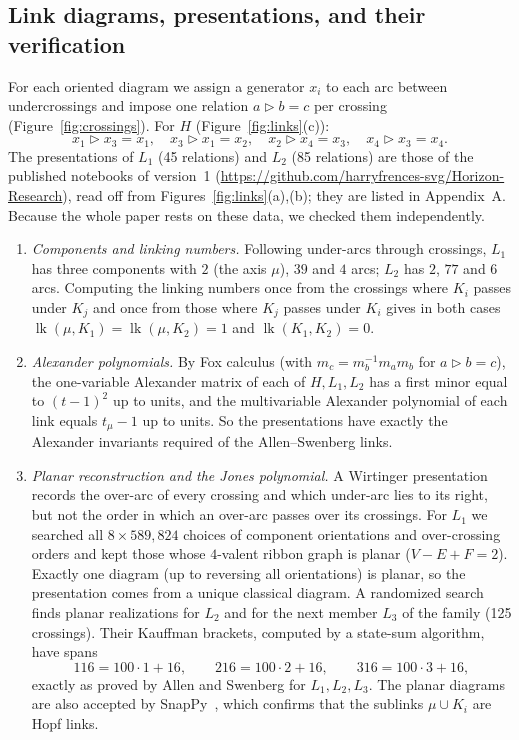 \documentclass[11pt]{article}
\theoremstyle{definition}
\newcommand{\lk}{\operatorname{lk}}
\newcommand{\tr}{\triangleright}
\begin{document}
\subsection{Link diagrams, presentations, and their verification}\label{ssec:data}

For each oriented diagram we assign a generator $x_i$ to each arc between undercrossings and impose one
relation $a\tr b=c$ per crossing (Figure~\ref{fig:crossings}). For $H$ (Figure~\ref{fig:links}(c)):
\[
x_1\tr x_3=x_1,\quad x_3\tr x_1=x_2,\quad x_2\tr x_4=x_3,\quad x_4\tr x_3=x_4 .
\]
The presentations of $L_1$ (45 relations) and $L_2$ (85 relations) are those of the published
notebooks of version~1 (\url{https://github.com/harryfrences-svg/Horizon-Research}), read off from
Figures~\ref{fig:links}(a),(b); they are listed in Appendix~A. Because the whole paper rests on these data, we checked them independently.

\begin{enumerate}
\item \emph{Components and linking numbers.} Following under-arcs through crossings, $L_1$ has three
components with $2$ (the axis $\mu$), $39$ and $4$ arcs; $L_2$ has $2$, $77$ and $6$ arcs. Computing the
linking numbers once from the crossings where $K_i$ passes under $K_j$ and once from those where $K_j$
passes under $K_i$ gives in both cases $\lk(\mu,K_1)=\lk(\mu,K_2)=1$ and $\lk(K_1,K_2)=0$.
\item \emph{Alexander polynomials.} By Fox calculus (with $m_c=m_b^{-1}m_am_b$ for $a\tr b=c$), the
one-variable Alexander matrix of each of $H,L_1,L_2$ has a first minor equal to $(t-1)^2$ up to units,
and the multivariable Alexander polynomial of each link equals $t_\mu-1$ up to units. So the
presentations have exactly the Alexander invariants required of the Allen--Swenberg links.
\item \emph{Planar reconstruction and the Jones polynomial.} A Wirtinger presentation records the
over-arc of every crossing and which under-arc lies to its right, but not the order in which an
over-arc passes over its crossings. For $L_1$ we searched all $8\times589{,}824$ choices of component
orientations and over-crossing orders and kept those whose $4$-valent ribbon graph is planar
($V-E+F=2$). Exactly one diagram (up to reversing all orientations) is planar, so the presentation
comes from a unique classical diagram. A randomized search finds planar realizations for $L_2$ and for
the next member $L_3$ of the family (125 crossings). Their Kauffman brackets, computed by a state-sum
algorithm, have spans
\[
116=100\cdot1+16,\qquad 216=100\cdot2+16,\qquad 316=100\cdot3+16,
\]
exactly as proved by Allen and Swenberg for $L_1,L_2,L_3$. The planar diagrams are also accepted by
SnapPy~\cite{SnapPy}, which confirms that the sublinks $\mu\cup K_i$ are Hopf links.
\end{enumerate}
\end{document}
